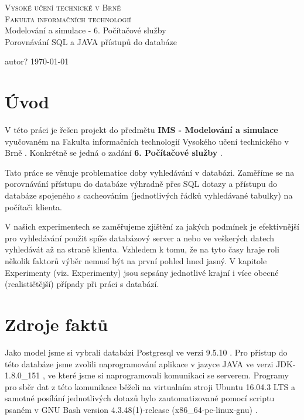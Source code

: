 \documentclass[a4paper, 11pt]{article}
\begin{document}
\thispagestyle{empty}
\begin{center}
\Huge
\textsc{Vysoké učení technické v Brně}\\
\huge
\textsc{Fakulta informačních technologií}\\
\LARGE
{}
Modelování a simulace - 6. Počítačové služby\\ \Huge Porovnávání SQL a JAVA přístupů do databáze
\end{center}

{
\LARGE \hfill
autor?%
\today \hfill
}%

\newpage
\thispagestyle{empty}

\tableofcontents

\newpage
\setcounter{page}{1}
\section{Úvod}
V této práci je řešen projekt do předmětu \textbf{IMS - Modelování a simulace} \cite{ims_web} vyučovaném na Fakulta informačních technologií Vysokého učení technického v Brně \cite{fit_web}. Konkrétně se jedná o zadání \textbf{6. Počítačové služby} \cite{zadani_web}.

Tato práce se věnuje problematice doby vyhledávání v databázi. Zaměříme se na porovnávání přístupu do databáze výhradně přes SQL dotazy a přístupu do databáze spojeného s cacheováním (jednotlivých řádků vyhledávané tabulky) na počítači klienta.

V našich experimentech se zaměřujeme zjištění za jakých podmínek je efektivnější pro vyhledávání použit spíše databázový server a nebo ve veškerých datech vyhledávát až na straně klienta. Vzhledem k tomu, že na tyto časy hraje roli několik faktorů výběr nemusí být na první pohled hned jasný. V kapitole Experimenty (viz.   Experimenty) jsou sepsány jednotlivé krajní i více obecné (realističtější) případy při práci s databází. 


\section{Zdroje faktů}
Jako model jsme si vybrali databázi Postgresql ve verzi 9.5.10 \cite{postgresql_web}. Pro přístup do této databáze jsme zvolili naprogramování aplikace v jazyce JAVA \cite{java_web} ve verzi JDK-1.8.0\_151 \cite{java_jdk_version}, ve které jsme si naprogramovali komunikaci se serverem. Programy pro sběr dat z této komunikace běželi na virtualním stroji Ubuntu 16.04.3 LTS \cite{ubuntu_web} a samotné posílání jednotlivých dotazů bylo zautomatizované pomocí scriptu psaném v GNU Bash version 4.3.48(1)-release (x86\_64-pc-linux-gnu) \cite{bash_web}.
\end{document}
